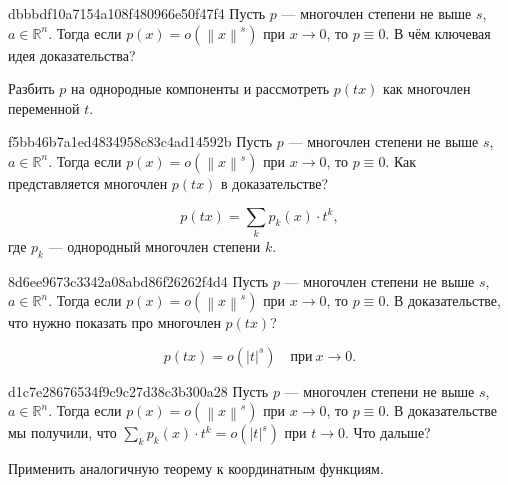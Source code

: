 \begin{note}{dbbbdf10a7154a108f480966e50f47f4}
    Пусть \({ p }\) --- многочлен степени не выше \({ s }\), \({ a \in \mathbb R^{n} }\).
    Тогда если \({ p(x) = o(\left\lVert x \right\rVert^{s}) }\) при \({ x \to 0 }\), то \({ p \equiv 0 }\).
    В чём ключевая идея доказательства?

    \begin{cloze}{1}
        Разбить \({ p }\) на однородные компоненты и рассмотреть \({ p(tx) }\) как многочлен переменной \({ t }\).
    \end{cloze}
\end{note}

\begin{note}{f5bb46b7a1ed4834958c83c4ad14592b}
    Пусть \({ p }\) --- многочлен степени не выше \({ s }\), \({ a \in \mathbb R^{n} }\).
    Тогда если \({ p(x) = o(\left\lVert x \right\rVert^{s}) }\) при \({ x \to 0 }\), то \({ p \equiv 0 }\).
    Как представляется многочлен \({ p(tx) }\) в доказательстве?

    \begin{cloze}{1}
        \[
            p(tx) = \sum_{k} p_k(x) \cdot t^{k},
        \]
        где \({ p_{k} }\) --- однородный многочлен степени \({ k }\).
    \end{cloze}
\end{note}

\begin{note}{8d6ee9673c3342a08abd86f26262f4d4}
    Пусть \({ p }\) --- многочлен степени не выше \({ s }\), \({ a \in \mathbb R^{n} }\).
    Тогда если \({ p(x) = o(\left\lVert x \right\rVert^{s}) }\) при \({ x \to 0 }\), то \({ p \equiv 0 }\).
    В доказательстве, что нужно показать про многочлен \({ p(tx) }\)?

    \begin{cloze}{1}
        \[
            p(tx) = o(\lvert t \rvert^{s}) \quad \text{при}\ x \to 0.
        \]
    \end{cloze}
\end{note}

\begin{note}{d1c7e28676534f9c9c27d38c3b300a28}
    Пусть \({ p }\) --- многочлен степени не выше \({ s }\), \({ a \in \mathbb R^{n} }\).
    Тогда если \({ p(x) = o(\left\lVert x \right\rVert^{s}) }\) при \({ x \to 0 }\), то \({ p \equiv 0 }\).
    В доказательстве мы получили, что \({ \sum_{k} p_k(x) \cdot t^{k} = o(\lvert t \rvert^{s}) }\) при \({ t \to 0 }\).
    Что дальше?

    \begin{cloze}{1}
        Применить аналогичную теорему к координатным функциям.
    \end{cloze}
\end{note}


